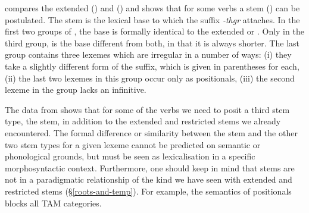  compares the extended (\Ext) and  (\Rs) and shows that for some verbs a  stem (\Pos) can be postulated. The  stem is the lexical base to which the  suffix \emph{-thgr} attaches. In the first two groups of , the base is formally identical to the extended or . Only in the third group, is the base different from both, in that it is always shorter. The last group contains three lexemes which are irregular in a number of ways: (i) they take a slightly different form of the  suffix, which is given in parentheses for each, (ii) the last two lexemes in this group occur only as positionals, (iii) the second lexeme in the group lacks an infinitive.%

The data from  shows that for some of the verbs we need to posit a third stem type, the  stem, in addition to the extended and restricted stems we already encountered. The formal difference or similarity between the  stem and the other two stem types for a given lexeme cannot be predicted on semantic or phonological grounds, but must be seen as lexicalisation in a specific morphosyntactic context. Furthermore, one should keep in mind that  stems are not in a paradigmatic relationship of the kind we have seen with extended and restricted stems (\S{}\ref{roots-and-temp}). For example, the  semantics of positionals blocks all  TAM categories.


